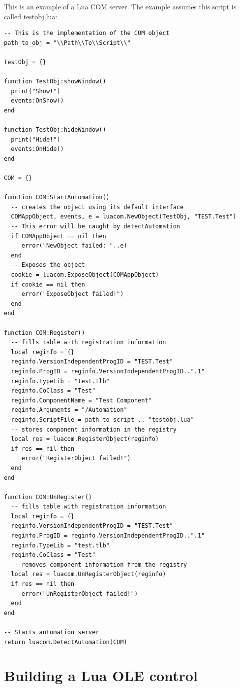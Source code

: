 \documentclass[11pt,a4paper,english]{report}
\begin{document}
This is an example of a Lua COM server. The example assumes this script is called testobj.lua:

\begin{verbatim}
-- This is the implementation of the COM object
path_to_obj = "\\Path\\To\\Script\\"

TestObj = {}

function TestObj:showWindow()
  print("Show!")
  events:OnShow()
end

function TestObj:hideWindow()
  print("Hide!")
  events:OnHide()
end

COM = {}

function COM:StartAutomation()
  -- creates the object using its default interface
  COMAppObject, events, e = luacom.NewObject(TestObj, "TEST.Test")
  -- This error will be caught by detectAutomation
  if COMAppObject == nil then
     error("NewObject failed: "..e)
  end
  -- Exposes the object
  cookie = luacom.ExposeObject(COMAppObject)
  if cookie == nil then
     error("ExposeObject failed!")
  end
end

function COM:Register()
  -- fills table with registration information
  local reginfo = {}
  reginfo.VersionIndependentProgID = "TEST.Test"
  reginfo.ProgID = reginfo.VersionIndependentProgID..".1"
  reginfo.TypeLib = "test.tlb"
  reginfo.CoClass = "Test"
  reginfo.ComponentName = "Test Component"
  reginfo.Arguments = "/Automation"
  reginfo.ScriptFile = path_to_script .. "testobj.lua"
  -- stores component information in the registry
  local res = luacom.RegisterObject(reginfo)
  if res == nil then
     error("RegisterObject failed!")
  end
end

function COM:UnRegister()
  -- fills table with registration information
  local reginfo = {}
  reginfo.VersionIndependentProgID = "TEST.Test"
  reginfo.ProgID = reginfo.VersionIndependentProgID..".1"
  reginfo.TypeLib = "test.tlb"
  reginfo.CoClass = "Test"
  -- removes component information from the registry
  local res = luacom.UnRegisterObject(reginfo)
  if res == nil then
     error("UnRegisterObject failed!")
  end
end

-- Starts automation server
return luacom.DetectAutomation(COM)
\end{verbatim}


\section{Building a Lua OLE control}
\end{document}
